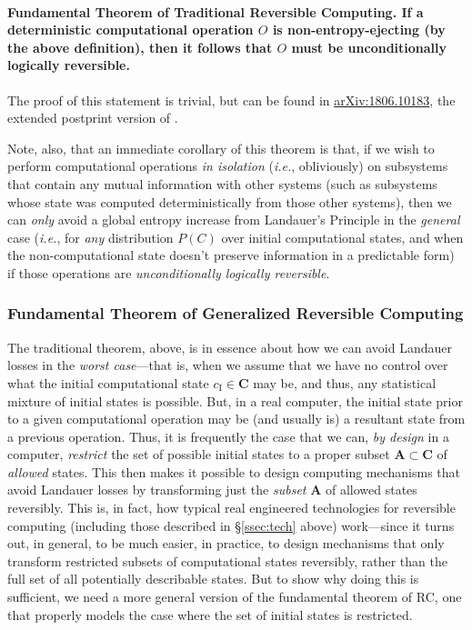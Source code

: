 \documentclass[preprints,article,accept,moreauthors,pdftex]{Definitions/mdpi}
\begin{document}
\begin{paracol}{2}
\paragraph{\textbf{Fundamental Theorem of Traditional Reversible Computing.} If a deterministic computational operation $O$ is non-entropy-ejecting (by the above definition), then it follows that $O$ must be unconditionally logically reversible.} The proof of this statement is trivial, but can be found in \href{https://arxiv.org/abs/1806.10183}{arXiv:1806.10183}, the extended postprint version of \cite{Fra17a}.

Note, also, that an immediate corollary of this theorem is that, if we wish to perform computational operations \emph{in isolation} (\emph{i.e.}, obliviously) on subsystems that contain any mutual information with other systems (such as subsystems whose state was computed deterministically from those other systems), then we can \emph{only} avoid a global entropy increase from Landauer's Principle in the \emph{general} case (\emph{i.e.}, for \textit{any} distribution $P(C)$ over initial computational states, and when the non-computational state doesn't preserve information in a predictable form) if those operations are \emph{unconditionally logically reversible}.

\subsubsection{Fundamental Theorem of Generalized Reversible Computing}
\label{sssec:gen-rc}

The traditional theorem, above, is in essence about how we can avoid Landauer losses in the \emph{worst case}---that is, when we assume that we have no control over what the initial computational state $c_{\mathrm{I}}\in\mathbf{C}$ may be, and thus, any statistical mixture of initial states is possible. But, in a real computer, the initial state prior to a given computational operation may be (and usually is) a resultant state from a previous operation. Thus, it is frequently the case that we can, \emph{by design} in a computer, \emph{restrict} the set of possible initial states to a proper subset $\boldsymbol{A} \subset \mathbf{C}$ of \emph{allowed} states. This then makes it possible to design computing mechanisms that avoid Landauer losses by transforming just the \emph{subset} $\boldsymbol{A}$ of allowed states reversibly. This is, in fact, how typical real engineered technologies for reversible computing (including those described in \S\ref{ssec:tech} above) work---since it turns out, in general, to be much easier, in practice, to design mechanisms that only transform restricted subsets of computational states reversibly, rather than the full set of all potentially describable states. But to show why doing this is sufficient, we need a more general version of the fundamental theorem of RC, one that properly models the case where the set of initial states is restricted.


\end{paracol}
\end{document}
